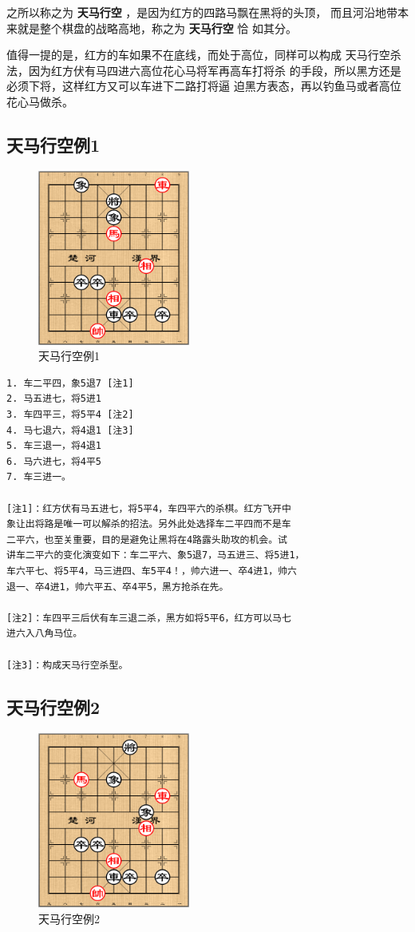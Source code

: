 \documentclass[a5paper,twoside]{book}
\begin{document}
之所以称之为 \textbf{天马行空} ，是因为红方的四路马飘在黑将的头顶，
而且河沿地带本来就是整个棋盘的战略高地，称之为 \textbf{天马行空} 恰
如其分。

值得一提的是，红方的车如果不在底线，而处于高位，同样可以构成
天马行空杀法，因为红方伏有马四进六高位花心马将军再高车打将杀
的手段，所以黑方还是必须下将，这样红方又可以车进下二路打将逼
迫黑方表态，再以钓鱼马或者高位花心马做杀。


\subsection{天马行空例1}
\label{sec-5-2-2}
\begin{figure}[H]
\centering
\includegraphics[width=5cm]{pic/天马行空例1.png}
\caption{天马行空例1}
\end{figure}

\begin{verbatim}
1. 车二平四，象5退7 [注1]
2. 马五进七，将5进1
3. 车四平三，将5平4 [注2]
4. 马七退六，将4退1 [注3]
5. 车三退一，将4退1
6. 马六进七，将4平5
7. 车三进一。

[注1]：红方伏有马五进七，将5平4，车四平六的杀棋。红方飞开中
象让出将路是唯一可以解杀的招法。另外此处选择车二平四而不是车
二平六，也至关重要，目的是避免让黑将在4路露头助攻的机会。试
讲车二平六的变化演变如下：车二平六、象5退7，马五进三、将5进1，
车六平七、将5平4，马三进四、车5平4！，帅六进一、卒4进1，帅六
退一、卒4进1，帅六平五、卒4平5，黑方抢杀在先。

[注2]：车四平三后伏有车三退二杀，黑方如将5平6，红方可以马七
进六入八角马位。

[注3]：构成天马行空杀型。
\end{verbatim}

\subsection{天马行空例2}
\label{sec-5-2-3}
\begin{figure}[H]
\centering
\includegraphics[width=5cm]{pic/天马行空例2.png}
\caption{天马行空例2}
\end{figure}
\end{document}
